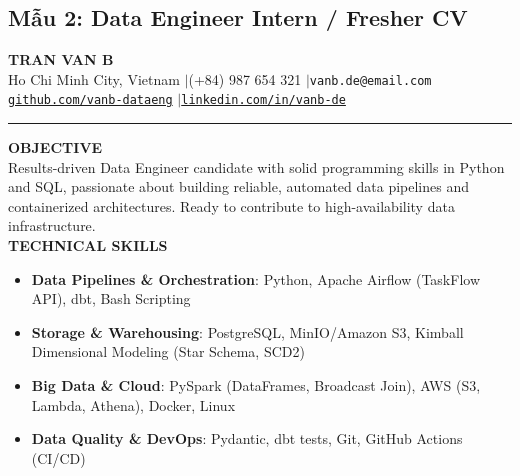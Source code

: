 \subsection{Mẫu 2: Data Engineer Intern / Fresher CV}
\begin{samplecvbox}
{\centering
    {\LARGE \textbf{TRAN VAN B}}\\[2pt]
    \small Ho Chi Minh City, Vietnam \enspace$|$\enspace (+84) 987 654 321 \enspace$|$\enspace \texttt{vanb.de@email.com}\\
    \href{https://github.com/vanb-dataeng}{\texttt{github.com/vanb-dataeng}} \enspace$|$\enspace \href{https://linkedin.com/in/vanb-de}{\texttt{linkedin.com/in/vanb-de}}\\[6pt]
}
\hrule\vspace{6pt}

\textbf{\large OBJECTIVE}\\
Results-driven Data Engineer candidate with solid programming skills in Python and SQL, passionate about building reliable, automated data pipelines and containerized architectures. Ready to contribute to high-availability data infrastructure.\\[6pt]

\textbf{\large TECHNICAL SKILLS}
\begin{itemize}[leftmargin=12pt, nosep]
    \item \textbf{Data Pipelines \& Orchestration}: Python, Apache Airflow (TaskFlow API), dbt, Bash Scripting
    \item \textbf{Storage \& Warehousing}: PostgreSQL, MinIO/Amazon S3, Kimball Dimensional Modeling (Star Schema, SCD2)
    \item \textbf{Big Data \& Cloud}: PySpark (DataFrames, Broadcast Join), AWS (S3, Lambda, Athena), Docker, Linux
    \item \textbf{Data Quality \& DevOps}: Pydantic, dbt tests, Git, GitHub Actions (CI/CD)
\end{itemize}\vspace{6pt}


\end{samplecvbox}
